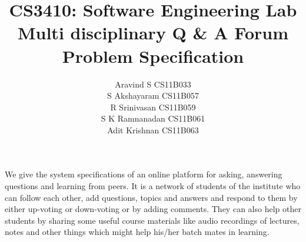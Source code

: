 \documentclass{article}
\begin{document}
\title{\textbf{CS3410: Software Engineering Lab}
\\
\textbf{Multi disciplinary Q \& A Forum\\Problem Specification}}
\author{ Aravind S CS11B033 \\
		 S Akshayaram CS11B057\\
		 R Srinivasan CS11B059\\
		 S K Ramnanadan CS11B061\\
		 Adit Krishnan  CS11B063\\
[0.2in]
}

\maketitle

We give the system specifications of an online platform for asking, answering questions and learning from peers. It is a network of students of the institute who can follow each other, add questions, topics and answers and respond to them by either up-voting or down-voting or by adding comments. They can also help other students by sharing some useful course materials like audio recordings of lectures, notes and other things which might help his/her batch mates in learning. 
\end{document}
